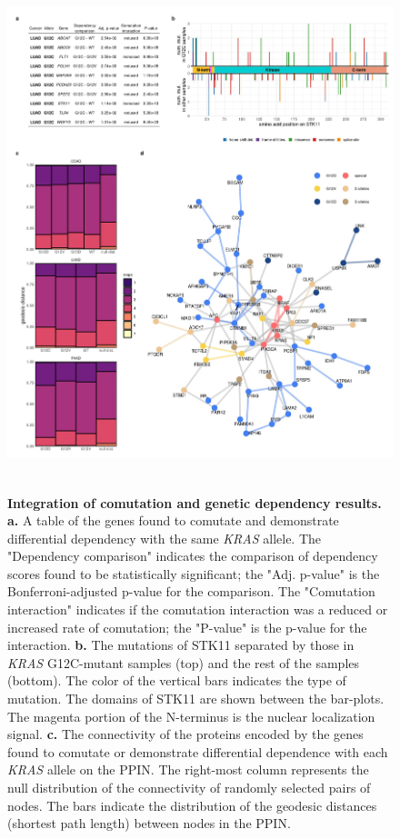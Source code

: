 \documentclass[english, 12pt, letterpaper]{article}
\newcommand{\KRAS}{\emph{KRAS}}
\begin{document}
\begin{figure}
\centering
\includegraphics[height=150mm]{figures/Figure_05.jpeg}
\caption{
    \textbf{Integration of comutation and genetic dependency results.}
    \textbf{a.} A table of the genes found to comutate and demonstrate differential dependency with the same \KRAS{} allele. The "Dependency comparison" indicates the comparison of dependency scores found to be statistically significant; the "Adj. p-value" is the Bonferroni-adjusted p-value for the comparison. The "Comutation interaction" indicates if the comutation interaction was a reduced or increased rate of comutation; the "P-value" is the p-value for the interaction.
    \textbf{b.} The mutations of STK11 separated by those in \KRAS{} G12C-mutant samples (top) and the rest of the samples (bottom). The color of the vertical bars indicates the type of mutation. The domains of STK11 are shown between the bar-plots. The magenta portion of the N-terminus is the nuclear localization signal.
    \textbf{c.} The connectivity of the proteins encoded by the genes found to comutate or demonstrate differential dependence with each \KRAS{} allele on the PPIN. The right-most column represents the null distribution of the connectivity of randomly selected pairs of nodes. The bars indicate the distribution of the geodesic distances (shortest path length) between nodes in the PPIN.
}
\end{figure}
\end{document}
